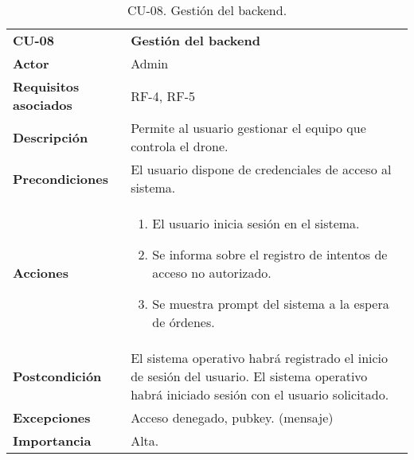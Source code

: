\begin{table}[H]
	\begin{center}
		\begin{tabular}{m{3cm} | m{10cm}}\hline
			\toprule
			\textbf{CU-08} & \textbf{Gestión del backend}\\
			\otoprule
			\textbf{Actor} & Admin\\
			\textbf{Requisitos asociados} & RF-4, RF-5\\
			\textbf{Descripción} & Permite al usuario gestionar el equipo que controla el drone.\\
			\textbf{Precondiciones} & El usuario dispone de credenciales de acceso al sistema.\\
			\textbf{Acciones} & \begin{enumerate}
											\item El usuario inicia sesión en el sistema.
											\item Se informa sobre el registro de intentos de acceso no autorizado.
											\item Se muestra prompt del sistema a la espera de órdenes.
											\end{enumerate}\\
			
			\textbf{Postcondición} & El sistema operativo habrá registrado el inicio de sesión del usuario. El sistema operativo habrá iniciado sesión con el usuario solicitado.\\
			\textbf{Excepciones} & Acceso denegado, pubkey. (mensaje)\\
			\textbf{Importancia} & Alta.\\
			\hline
			\bottomrule
		\end{tabular}
		\caption{CU-08. Gestión del backend.}
		\label{tb:CU08}
	\end{center}
\end{table}


